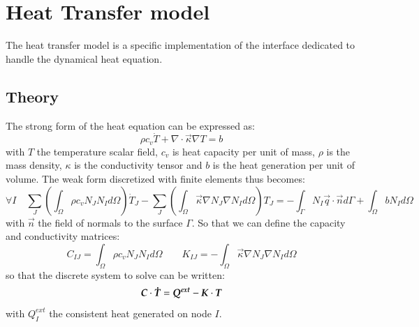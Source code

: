 \section{Heat Transfer model}

The heat transfer model is a specific implementation of the  interface
dedicated to handle the dynamical heat equation. 
\subsection{Theory}
The strong form of the heat equation 
can be expressed as:
\begin{equation}
  \rho c_v \dot{T} + \nabla \cdot \vec{\kappa} \nabla T = b
\end{equation}
with $T$ the temperature scalar field,
$c_v$ is heat capacity per unit of mass, $\rho$ is the mass density, 
$\kappa$ is the conductivity tensor and $b$ is the heat generation per unit of volume. 
The weak form discretized with finite elements thus becomes:
\begin{equation}
  \forall I \quad 
  \sum_J \left( \int_\Omega \rho c_v N_J N_I  d\Omega \right) \dot{T}_J 
  - \sum_J \left( \int_\Omega \vec{\kappa} \nabla N_J \nabla N_I d\Omega \right) T_J = 
  - \int_{\Gamma}  N_I \vec{q} \cdot \vec{n} d\Gamma + \int_\Omega b N_I d\Omega
\end{equation}
with $\vec{n}$ the field of normals to the surface $\Gamma$. 
So that we can define the capacity and conductivity matrices:
\begin{equation}
  C_{IJ} = \int_\Omega \rho c_v N_J N_I  d\Omega \qquad   
  K_{IJ} = - \int_\Omega \vec{\kappa} \nabla N_J \nabla N_I d\Omega
\end{equation}
so that the discrete system to solve can be written:
\begin{equation}
  \boldsymbol{C} \cdot \boldsymbol{\dot{T}} = \boldsymbol{Q^{ext}} -\boldsymbol{K} \cdot \boldsymbol{T} 
\end{equation}
with $Q^{ext}_I$ the consistent heat generated on node $I$.
